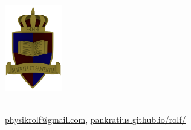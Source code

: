 \documentclass[a4paper]{article}
\begin{document}
	\vspace*{-2cm}
	\parbox{4cm}{\includegraphics[width=2.5cm]{../images/ROLF4.png}}
	\parbox{10.6cm}{ \\ \href{mailto:physikrolf@gmail.com}{physikrolf@gmail.com}, \url{pankratius.github.io/rolf/} \\ \vspace*{-.5cm} }
	

\thispagestyle{empty}


\noindent



\end{document}
